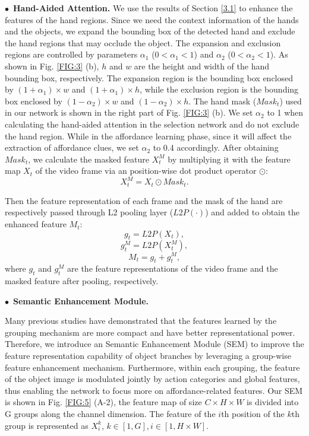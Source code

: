 \documentclass[journal,twoside]{IEEEtran}
\newcommand{\myPara}[1]{\vspace{5pt}\noindent$\bullet$~\textbf{#1} \quad}
\begin{document}
\myPara{Hand-Aided Attention.}
\label{hand-aided}
We use the results of Section \ref{3.1} to enhance the features of the hand regions. Since we need the context information of the hands and the objects, we expand the bounding box of the detected hand and exclude the hand regions that may occlude the object. The expansion and exclusion regions are controlled by parameters $\alpha_{1}$ ($0<\alpha_{1}<1$) and $\alpha_{2}$ ($0<\alpha_{2}<1$). As shown in Fig. \ref{FIG:3} (b), $h$ and $w$ are the height and width of the hand bounding box, respectively. The expansion region is the bounding box enclosed by $(1+\alpha_{1})\times w$ and $(1+\alpha_{1})\times h$, while the exclusion region is the bounding box enclosed by $(1-\alpha_{2})\times w$ and $(1-\alpha_{2})\times h$. The hand mask ($Mask_t$) used in our network is shown in the right part of Fig. \ref{FIG:3} (b). We set $\alpha_{2}$ to 1 when calculating the hand-aided attention in the selection network and do not exclude the hand region. While in the affordance learning phase, since it will affect the extraction of affordance clues, we set $\alpha_{2}$ to 0.4 accordingly. After obtaining $Mask_t$, we calculate the masked feature $X_{t}^M$ by multiplying it with the feature map $X_{t}$ of the video frame via an position-wise dot product operator $\odot$:
\begin{equation}
    X_{t}^M=X_{t} \odot Mask_{t}. \label{eq:no1}
\end{equation}

Then the feature representation of each frame and the mask of the hand are respectively passed through L2 pooling layer ($L2P(\cdot)$) and added to obtain the enhanced feature $M_t$:
\begin{equation}
    g_{t}=L2P(X_{t}), \label{eq:no2}
\end{equation}
\begin{equation}
    g_{t}^M=L2P(X_{t}^M), \label{eq:no3}
\end{equation}
\begin{equation}
    M_{t}=g_{t}+g_{t}^M, \label{eq:no4}
\end{equation}
where $g_{t}$ and $g_{t}^M$ are the feature representations of the video frame and the masked feature after pooling, respectively.

\label{SEM}
\myPara{Semantic Enhancement Module.}
 
Many previous studies \cite{singh2019hetconv,sun2019high,wu2018group} have demonstrated that the features learned by the grouping mechanism are more compact and have better representational power. Therefore, we introduce an Semantic Enhancement Module (SEM) to improve the feature representation capability of object branches by leveraging a group-wise feature enhancement mechanism. Furthermore, within each grouping, the feature of the object image is modulated jointly by action categories and global features, thus enabling the network to focus more on affordance-related features. Our SEM is shown in Fig. \ref{FIG:5} (A-2), the feature map of size $C \times H \times W$ is divided into G groups along the channel dimension. The feature of the $i$th position of the $k$th group is represented as $X_i^k$, $k \in [1,G], i \in [1,H\times W]$. 
\end{document}
